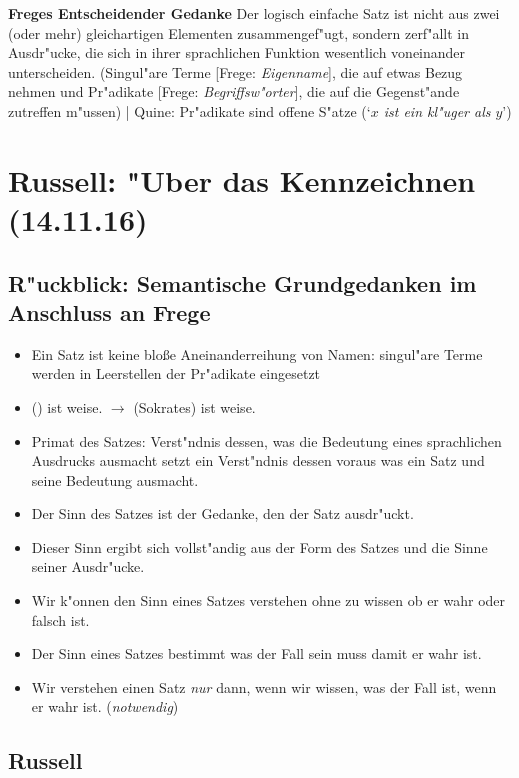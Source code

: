 \documentclass[emulatestandardclasses]{scrartcl}
\begin{document}
\textbf{Freges Entscheidender Gedanke} Der logisch einfache Satz ist nicht aus zwei (oder mehr) gleichartigen Elementen zusammengef"ugt, sondern zerf"allt in Ausdr"ucke, die sich in ihrer sprachlichen Funktion wesentlich voneinander unterscheiden. (Singul"are Terme [Frege: \emph{Eigenname}], die auf etwas Bezug nehmen und Pr"adikate [Frege: \emph{Begriffsw"orter}], die auf die Gegenst"ande zutreffen m"ussen) | Quine: Pr"adikate sind offene S"atze (`\emph{$x$ ist ein kl"uger als $y$}')

\section{Russell: "Uber das Kennzeichnen\\(14.11.16)}

\subsection{R"uckblick: Semantische Grundgedanken im Anschluss an Frege}

\begin{itemize}
  \item Ein Satz ist keine blo\ss e Aneinanderreihung von Namen: singul"are Terme werden in Leerstellen der Pr"adikate eingesetzt
  \item () ist weise. $\rightarrow$ (Sokrates) ist weise.
  \item Primat des Satzes: Verst"ndnis dessen, was die Bedeutung eines sprachlichen Ausdrucks ausmacht setzt ein Verst"ndnis dessen voraus was ein Satz und seine Bedeutung ausmacht.
  \item Der Sinn des Satzes ist der Gedanke, den der Satz ausdr"uckt.
  \item Dieser Sinn ergibt sich vollst"andig aus der Form des Satzes und die Sinne seiner Ausdr"ucke.
  \item Wir k"onnen den Sinn eines Satzes verstehen ohne zu wissen ob er wahr oder falsch ist.
  \item Der Sinn eines Satzes bestimmt was der Fall sein muss damit er wahr ist.
  \item Wir verstehen einen Satz \emph{nur} dann, wenn wir wissen, was der Fall ist, wenn er wahr ist. (\emph{notwendig})
\end{itemize}

\subsection{Russell}
\end{document}
